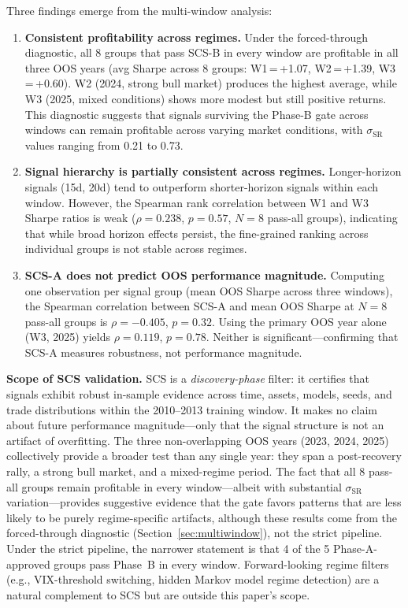 \documentclass[12pt,a4paper]{article}
\begin{document}
Three findings emerge from the multi-window analysis:

\begin{enumerate}
  \item \textbf{Consistent profitability across regimes.} Under the forced-through diagnostic, all 8 groups that pass SCS-B in every window are profitable in all three OOS years (avg Sharpe across 8 groups: W1\,=\,+1.07, W2\,=\,+1.39, W3\,=\,+0.60). W2 (2024, strong bull market) produces the highest average, while W3 (2025, mixed conditions) shows more modest but still positive returns. This diagnostic suggests that signals surviving the Phase-B gate across windows can remain profitable across varying market conditions, with $\sigma_{\text{SR}}$ values ranging from 0.21 to 0.73.

  \item \textbf{Signal hierarchy is partially consistent across regimes.} Longer-horizon signals (15d, 20d) tend to outperform shorter-horizon signals within each window. However, the Spearman rank correlation between W1 and W3 Sharpe ratios is weak ($\rho = 0.238$, $p = 0.57$, $N=8$ pass-all groups), indicating that while broad horizon effects persist, the fine-grained ranking across individual groups is not stable across regimes.

  \item \textbf{SCS-A does not predict OOS performance magnitude.} Computing one observation per signal group (mean OOS Sharpe across three windows), the Spearman correlation between SCS-A and mean OOS Sharpe at $N=8$ pass-all groups is $\rho = -0.405$, $p = 0.32$. Using the primary OOS year alone (W3, 2025) yields $\rho = 0.119$, $p = 0.78$. Neither is significant---confirming that SCS-A measures robustness, not performance magnitude.
\end{enumerate}

\textbf{Scope of SCS validation.} SCS is a \emph{discovery-phase} filter: it certifies that signals exhibit robust in-sample evidence across time, assets, models, seeds, and trade distributions within the 2010--2013 training window. It makes no claim about future performance magnitude---only that the signal structure is not an artifact of overfitting. The three non-overlapping OOS years (2023, 2024, 2025) collectively provide a broader test than any single year: they span a post-recovery rally, a strong bull market, and a mixed-regime period. The fact that all 8 pass-all groups remain profitable in every window---albeit with substantial $\sigma_{\text{SR}}$ variation---provides suggestive evidence that the gate favors patterns that are less likely to be purely regime-specific artifacts, although these results come from the forced-through diagnostic (Section~\ref{sec:multiwindow}), not the strict pipeline. Under the strict pipeline, the narrower statement is that 4 of the 5 Phase-A-approved groups pass Phase~B in every window. Forward-looking regime filters (e.g., VIX-threshold switching, hidden Markov model regime detection) are a natural complement to SCS but are outside this paper's scope.
\end{document}
